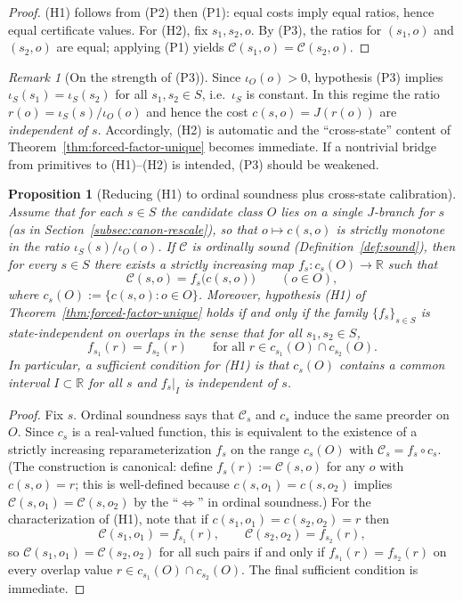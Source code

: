 \documentclass[11pt,reqno]{amsart}
\newtheorem{proposition}[theorem]{Proposition}
\theoremstyle{definition}
\theoremstyle{remark}
\newtheorem{remark}[theorem]{Remark} %
\newcommand{\R}{\mathbb{R}}
\newcommand{\1}{\mathbf{1}}
\begin{document}
\begin{proof}
(H1) follows from (P2) then (P1): equal costs imply equal ratios, hence equal certificate values.
For (H2), fix $s_1,s_2,o$.
By (P3), the ratios for $(s_1,o)$ and $(s_2,o)$ are equal; applying (P1) yields
$\mathcal C(s_1,o)=\mathcal C(s_2,o)$.
\end{proof}


\begin{remark}[On the strength of (P3)]
Since $\iota_O(o)>0$, hypothesis (P3) implies $\iota_S(s_1)=\iota_S(s_2)$ for all $s_1,s_2\in S$, i.e.\ $\iota_S$ is constant.
In this regime the ratio $r(o)=\iota_S(s)/\iota_O(o)$ and hence the cost $c(s,o)=J(r(o))$ are \emph{independent of $s$}.
Accordingly, (H2) is automatic and the ``cross-state'' content of Theorem~\ref{thm:forced-factor-unique} becomes immediate.
If a nontrivial bridge from primitives to (H1)--(H2) is intended, (P3) should be weakened.
\end{remark}





\begin{proposition}[Reducing \textup{(H1)} to ordinal soundness plus cross-state calibration]\label{prop:reduce-H1}
Assume that for each $s\in S$ the candidate class $O$ lies on a single $J$-branch for $s$
(as in Section~\ref{subsec:canon-rescale}), so that $o\mapsto c(s,o)$ is strictly monotone in the ratio
$\iota_S(s)/\iota_O(o)$.
If $\mathcal C$ is ordinally sound (Definition~\ref{def:sound}), then for every $s\in S$ there exists a strictly
increasing map $f_s:c_s(O)\to\R$ such that
\[
\mathcal C(s,o)=f_s\bigl(c(s,o)\bigr)\qquad(o\in O),
\]
where $c_s(O):=\{c(s,o):o\in O\}$.
Moreover, hypothesis \textup{(H1)} of Theorem~\ref{thm:forced-factor-unique} holds if and only if the family
$\{f_s\}_{s\in S}$ is \emph{state-independent on overlaps} in the sense that for all $s_1,s_2\in S$,
\[
f_{s_1}(r)=f_{s_2}(r)\qquad\text{for all }r\in c_{s_1}(O)\cap c_{s_2}(O).
\]
In particular, a sufficient condition for \textup{(H1)} is that $c_s(O)$ contains a common interval
$I\subset\R$ for all $s$ and $f_s|_I$ is independent of $s$.
\end{proposition}

\begin{proof}
Fix $s$. Ordinal soundness says that $\mathcal C_s$ and $c_s$ induce the same preorder on $O$.
Since $c_s$ is a real-valued function, this is equivalent to the existence of a strictly increasing
reparameterization $f_s$ on the range $c_s(O)$ with $\mathcal C_s=f_s\circ c_s$.
(The construction is canonical: define $f_s(r):=\mathcal C(s,o)$ for any $o$ with $c(s,o)=r$; this is well-defined
because $c(s,o_1)=c(s,o_2)$ implies $\mathcal C(s,o_1)=\mathcal C(s,o_2)$ by the ``$\Leftrightarrow$'' in ordinal soundness.)
For the characterization of \textup{(H1)}, note that if $c(s_1,o_1)=c(s_2,o_2)=r$ then
\[
\mathcal C(s_1,o_1)=f_{s_1}(r),\qquad \mathcal C(s_2,o_2)=f_{s_2}(r),
\]
so $\mathcal C(s_1,o_1)=\mathcal C(s_2,o_2)$ for all such pairs if and only if $f_{s_1}(r)=f_{s_2}(r)$ on every
overlap value $r\in c_{s_1}(O)\cap c_{s_2}(O)$.
The final sufficient condition is immediate.
\end{proof}
\end{document}
